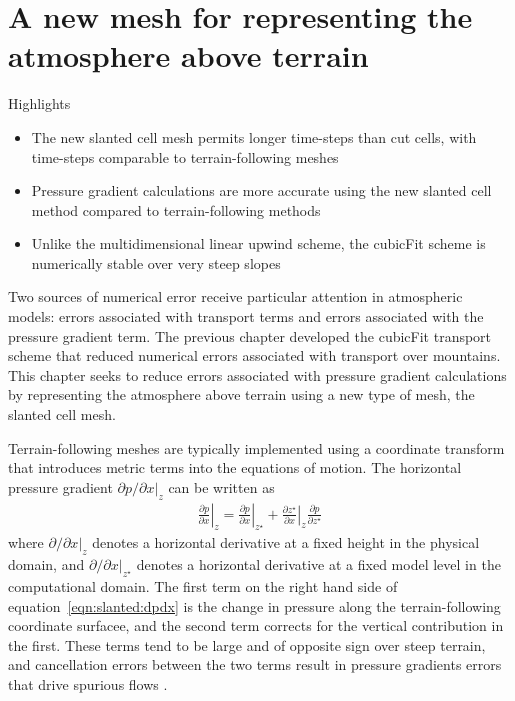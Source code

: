 \chapter{A new mesh for representing the atmosphere above terrain}
\label{ch:slanted}

\begin{highlights}
{\Large Highlights}
\begin{itemize}
	\item The new slanted cell mesh permits longer time-steps than cut cells, with time-steps comparable to terrain-following meshes
	\item Pressure gradient calculations are more accurate using the new slanted cell method compared to terrain-following methods
	\item Unlike the multidimensional linear upwind scheme, the cubicFit scheme is numerically stable over very steep slopes
\end{itemize}
\end{highlights}

Two sources of numerical error receive particular attention in atmospheric models: errors associated with transport terms and errors associated with the pressure gradient term.
The previous chapter developed the cubicFit transport scheme that reduced numerical errors associated with transport over mountains.
This chapter seeks to reduce errors associated with pressure gradient calculations by representing the atmosphere above terrain using a new type of mesh, the slanted cell mesh.


Terrain-following meshes are typically implemented using a coordinate transform that introduces metric terms into the equations of motion.  The horizontal pressure gradient $\left. \partial p / \partial x \right|_z$ can be written as \citep{mahrer1984}
\begin{align}
	\left. \frac{\partial p}{\partial x} \right|_z = 
	\left. \frac{\partial p}{\partial x} \right|_{z^\star} +
	\left. \frac{\partial z^\star}{\partial x} \right|_z
	\frac{\partial p}{\partial z^\star} \label{eqn:slanted:dpdx}
\end{align}
where $\left. \partial / \partial x \right|_z$ denotes a horizontal derivative at a fixed height in the physical domain, and $\left. \partial / \partial x \right|_{z^\star}$ denotes a horizontal derivative at a fixed model level in the computational domain.  The first term on the right hand side of equation~\eqref{eqn:slanted:dpdx} is the change in pressure along the terrain-following coordinate surfacee, and the second term corrects for the vertical contribution in the first.
These terms tend to be large and of opposite sign over steep terrain, and cancellation errors between the two terms result in pressure gradients errors that drive spurious flows \citep{fast2003}.

